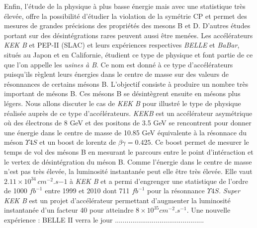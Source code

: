   Enfin, l'\'etude de la physique \`a plus basse \'energie mais avec une statistique tr\`es \'elev\'ee, offre la possibilit\'e d'\'etudier la violation de la sym\'etrie CP et permet des mesures de grandes pr\'ecisions des propri\'et\'es des mesons B et D. D'autres \'etudes portant sur des d\'esint\'egrations rares peuvent aussi \^etre men\'ees. Les acc\'el\'erateurs \textit{KEK B} et PEP-II (SLAC) et leurs exp\'eriences respectives \textit{BELLE} et \textit{BaBar}, situ\'es au Japon et en Californie, \'etudient ce type de physique et font partie de ce que l'on appelle les \textit{usines \`a B}. Ce nom est donn\'e \`a ce type d'acc\'el\'erateurs puisqu'ils r\`eglent leurs \'energies dans le centre de masse sur des valeurs de r\'esonnances de certains m\'esons B. L'objectif consiste \`a produire un nombre tr\`es important de m\'esons B. Ces m\'esons B se d\'esint\`egrent ensuite en m\'esons plus l\'egers. Nous allons discuter le cas de \textit{KEK B} pour illustr\'e le type de physique r\'ealis\'ee aupr\`es de ce type d'acc\'el\'erateurs. \textit{KEKB} est un acc\'el\'erateur asym\'etrique o\`u des \'electrons de 8 GeV et des positons de 3.5 GeV se rencontrent pour donner une \'energie dans le centre de masse de 10.85 GeV \'equivalente \`a la r\'esonnace du m\'eson $\Upsilon 4S$ et un boost de lorentz de $\beta\gamma = 0.425$. Ce boost permet de mesurer le temps de vol des m\'esons B en mesurant le parcours entre le point d'int\'eraction et le vertex de d\'esint\'egration du m\'eson B. Comme l'\'energie dans le centre de masse n'est pas tr\`es \'elev\'ee, la luminosit\'e instantan\'ee peut elle \^etre tr\`es \'elev\'ee. Elle vaut $2.11 \times 10^{34} \, cm^{-2}.s{-1}$ \`a \textit{KEK B} et a permi d'engrenger une statistique de l'ordre de 1000 $fb^{-1}$ entre 1999 et 2010 dont 711 $fb^{-1}$ pour la r\'esonnance $\Upsilon 4S$. \textit{Super KEK B} est un projet d'acc\'el\'erateur permettant d'augmenter la luminosit\'e instantan\'ee d'un facteur 40 pour atteindre $8 \times 10^{35} cm^{-2}.s^{-1}$. Une nouvelle exp\'erience : BELLE II verra le jour ..............................................
  
  
  
  
  
